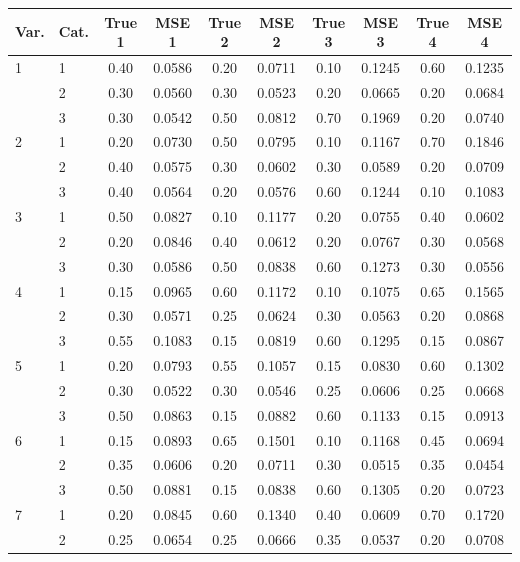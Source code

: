 \begin{longtable}{llcccccccc}
  \toprule
\textbf{Var.} & \textbf{Cat.} & \textbf{True 1} & \textbf{MSE 1} & \textbf{True 2} & \textbf{MSE 2} & \textbf{True 3} & \textbf{MSE 3} & \textbf{True 4} & \textbf{MSE 4} \\ 
  \midrule
1 & 1 & 0.40 & 0.0586 & 0.20 & 0.0711 & 0.10 & 0.1245 & 0.60 & 0.1235 \\ 
   & 2 & 0.30 & 0.0560 & 0.30 & 0.0523 & 0.20 & 0.0665 & 0.20 & 0.0684 \\ 
   & 3 & 0.30 & 0.0542 & 0.50 & 0.0812 & 0.70 & 0.1969 & 0.20 & 0.0740 \\ 
  2 & 1 & 0.20 & 0.0730 & 0.50 & 0.0795 & 0.10 & 0.1167 & 0.70 & 0.1846 \\ 
   & 2 & 0.40 & 0.0575 & 0.30 & 0.0602 & 0.30 & 0.0589 & 0.20 & 0.0709 \\ 
   & 3 & 0.40 & 0.0564 & 0.20 & 0.0576 & 0.60 & 0.1244 & 0.10 & 0.1083 \\ 
  3 & 1 & 0.50 & 0.0827 & 0.10 & 0.1177 & 0.20 & 0.0755 & 0.40 & 0.0602 \\ 
   & 2 & 0.20 & 0.0846 & 0.40 & 0.0612 & 0.20 & 0.0767 & 0.30 & 0.0568 \\ 
   & 3 & 0.30 & 0.0586 & 0.50 & 0.0838 & 0.60 & 0.1273 & 0.30 & 0.0556 \\ 
  4 & 1 & 0.15 & 0.0965 & 0.60 & 0.1172 & 0.10 & 0.1075 & 0.65 & 0.1565 \\ 
   & 2 & 0.30 & 0.0571 & 0.25 & 0.0624 & 0.30 & 0.0563 & 0.20 & 0.0868 \\ 
   & 3 & 0.55 & 0.1083 & 0.15 & 0.0819 & 0.60 & 0.1295 & 0.15 & 0.0867 \\ 
  5 & 1 & 0.20 & 0.0793 & 0.55 & 0.1057 & 0.15 & 0.0830 & 0.60 & 0.1302 \\ 
   & 2 & 0.30 & 0.0522 & 0.30 & 0.0546 & 0.25 & 0.0606 & 0.25 & 0.0668 \\ 
   & 3 & 0.50 & 0.0863 & 0.15 & 0.0882 & 0.60 & 0.1133 & 0.15 & 0.0913 \\ 
  6 & 1 & 0.15 & 0.0893 & 0.65 & 0.1501 & 0.10 & 0.1168 & 0.45 & 0.0694 \\ 
   & 2 & 0.35 & 0.0606 & 0.20 & 0.0711 & 0.30 & 0.0515 & 0.35 & 0.0454 \\ 
   & 3 & 0.50 & 0.0881 & 0.15 & 0.0838 & 0.60 & 0.1305 & 0.20 & 0.0723 \\ 
  7 & 1 & 0.20 & 0.0845 & 0.60 & 0.1340 & 0.40 & 0.0609 & 0.70 & 0.1720 \\ 
   & 2 & 0.25 & 0.0654 & 0.25 & 0.0666 & 0.35 & 0.0537 & 0.20 & 0.0708 \\ 

\end{longtable}
